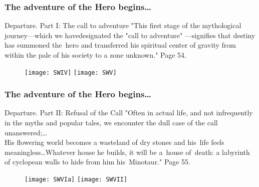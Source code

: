 \documentclass{beamer}  %
\begin{document}
\begin{frame}
  \frametitle{The adventure of the Hero begins\ldots}

  \begin{block}{Departure. Part I: The call to adventure}
    "This first stage of the mythological journey—which we
    havedesignated the "call to adventure" —signifies that destiny has
    summoned the~hero and transferred his spiritual center of gravity
    from within the pale of his society to a zone unknown." Page 54.
  \end{block}

  \begin{block}{}
    \begin{figure}
      \centering

      \texttt{[image: SWIV]}
      \texttt{[image: SWV]}
    \end{figure}
  \end{block}

\end{frame}



\begin{frame}
  \frametitle{The adventure of the Hero begins\ldots}

  \begin{block}{Departure. Part II: Refusal of the Call}
    "Often in actual life, and not infrequently in the myths and
    popular
    tales, we encounter the dull case of the call unanswered;\ldots \\
    His flowering world becomes a wasteland of dry stones and his~life
    feels meaningless\ldots Whatever house he builds, it will be
    a~house of~death: a labyrinth of cyclopean walls to hide from him
    his~Minotaur." Page 55.
  \end{block}

  \begin{block}{}
    \begin{figure}
      \centering

      \texttt{[image: SWVIa]}
      \texttt{[image: SWVII]}
    \end{figure}
  \end{block}

\end{frame}
\end{document}
